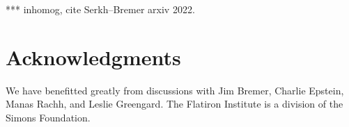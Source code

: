 \documentclass[10pt]{article}
\begin{document}
*** inhomog, cite Serkh--Bremer arxiv 2022.


\section*{Acknowledgments}
We have benefitted greatly from discussions with Jim Bremer, Charlie Epstein,
Manas Rachh, and Leslie Greengard.
The Flatiron Institute is a division of the Simons Foundation.













\end{document}

